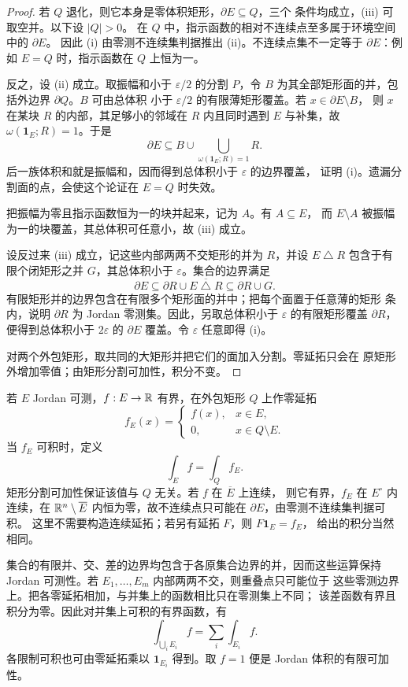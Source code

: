 \begin{proof}
若 $Q$ 退化，则它本身是零体积矩形，$\partial E\subseteq Q$，三个
条件均成立，(iii) 可取空并。以下设 $|Q|>0$。
在 $Q$ 中，指示函数的相对不连续点至多属于环境空间中的 $\partial E$。
因此 (i) 由零测不连续集判据推出 (ii)。不连续点集不一定等于
$\partial E$：例如 $E=Q$ 时，指示函数在 $Q$ 上恒为一。

反之，设 (ii) 成立。取振幅和小于 $\varepsilon/2$ 的分割 $P$，令
$B$ 为其全部矩形面的并，包括外边界 $\partial Q$。$B$ 可由总体积
小于 $\varepsilon/2$ 的有限薄矩形覆盖。若 $x\in\partial E\setminus B$，
则 $x$ 在某块 $R$ 的内部，其足够小的邻域在 $R$ 内且同时遇到 $E$
与补集，故 $\omega(\mathbf1_E;R)=1$。于是
\[
 \partial E\subseteq B\cup
 \bigcup_{\omega(\mathbf1_E;R)=1}R.
\]
后一族体积和就是振幅和，因而得到总体积小于 $\varepsilon$ 的边界覆盖，
证明 (i)。遗漏分割面的点，会使这个论证在 $E=Q$ 时失效。

把振幅为零且指示函数恒为一的块并起来，记为 $A$。有 $A\subseteq E$，
而 $E\setminus A$ 被振幅为一的块覆盖，其总体积可任意小，故 (iii) 成立。

 设反过来 (iii) 成立，记这些内部两两不交矩形的并为 $R$，并设
 $E\mathbin\triangle R$ 包含于有限个闭矩形之并 $G$，其总体积小于
 $\varepsilon$。集合的边界满足
 \[
  \partial E\subseteq \partial R\cup\overline{E\mathbin\triangle R}
  \subseteq\partial R\cup G.
 \]
 有限矩形并的边界包含在有限多个矩形面的并中；把每个面置于任意薄的矩形
 条内，说明 $\partial R$ 为 Jordan 零测集。因此，另取总体积小于
 $\varepsilon$ 的有限矩形覆盖 $\partial R$，便得到总体积小于
 $2\varepsilon$ 的 $\partial E$ 覆盖。令 $\varepsilon$ 任意即得 (i)。

 对两个外包矩形，取共同的大矩形并把它们的面加入分割。零延拓只会在
 原矩形外增加零值；由矩形分割可加性，积分不变。
\end{proof}

若 $E$ Jordan 可测，$f:E\to\mathbb{R}$ 有界，在外包矩形 $Q$ 上作零延拓
\[
 f_E(x)=\begin{cases}f(x),&x\in E,\\0,&x\in Q\setminus E.\end{cases}
\]
当 $f_E$ 可积时，定义
\[
 \int_E f=\int_Q f_E.
\]
矩形分割可加性保证该值与 $Q$ 无关。若 $f$ 在 $\overline E$ 上连续，
则它有界，$f_E$ 在 $E^\circ$ 内连续，在 $\mathbb{R}^n\setminus\overline E$
内恒为零，故不连续点只可能在 $\partial E$，由零测不连续集判据可积。
这里不需要构造连续延拓；若另有延拓 $F$，则 $F\mathbf1_E=f_E$，
给出的积分当然相同。

集合的有限并、交、差的边界均包含于各原集合边界的并，因而这些运算保持
Jordan 可测性。若 $E_1,\ldots,E_m$ 内部两两不交，则重叠点只可能位于
这些零测边界上。把各零延拓相加，与并集上的函数相比只在零测集上不同；
该差函数有界且积分为零。因此对并集上可积的有界函数，有
\[
 \int_{\bigcup_iE_i}f=\sum_i\int_{E_i}f.
\]
各限制可积也可由零延拓乘以 $\mathbf1_{E_i}$ 得到。取 $f=1$ 便是
Jordan 体积的有限可加性。

